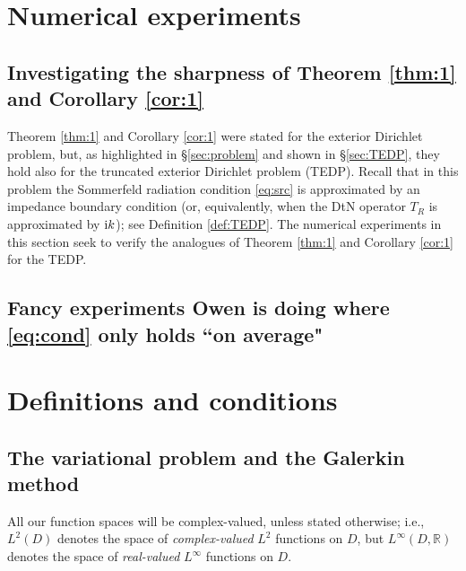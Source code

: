 \documentclass[10pt]{article}%
\numberwithin{equation}{section}
\newcommand{\ri}{{\rm i}}
\newcommand{\Rea}{\mathbb{R}}
\newcommand{\Com}{\mathbb{C}}
\newcommand{\dist}{\mathop{{\rm dist}}}
\newcommand{\domain}{\Omega}
\begin{document}
\section{Numerical experiments}\label{sec:num}

\subsection{Investigating the sharpness of Theorem \ref{thm:1} and Corollary \ref{cor:1}}

Theorem \ref{thm:1} and Corollary \ref{cor:1} were stated for the exterior Dirichlet problem, but, as highlighted in \S\ref{sec:problem} and shown in \S\ref{sec:TEDP}, they hold also for the truncated exterior Dirichlet problem (TEDP). Recall that in this problem the Sommerfeld radiation condition \eqref{eq:src} is approximated by an impedance boundary condition (or, equivalently, when the DtN operator $T_R$ is approximated by $\ri k$); see Definition \ref{def:TEDP}. The numerical experiments in this section seek to verify the analogues of Theorem \ref{thm:1} and Corollary \ref{cor:1} for the TEDP.

\subsection{Fancy experiments Owen is doing where \eqref{eq:cond} only holds ``on average"}


\section{Definitions and conditions}\label{sec:3}

\subsection{The variational problem and the Galerkin method}\label{sec:vpGm}

All our function spaces will be complex-valued, unless stated otherwise; i.e., $L^2(D)$ denotes the space of \emph{complex-valued} $L^2$ functions on $D$, but $L^\infty(D,\Rea)$ denotes the space of \emph{real-valued} $L^\infty$ functions on $D$.

\end{document}
